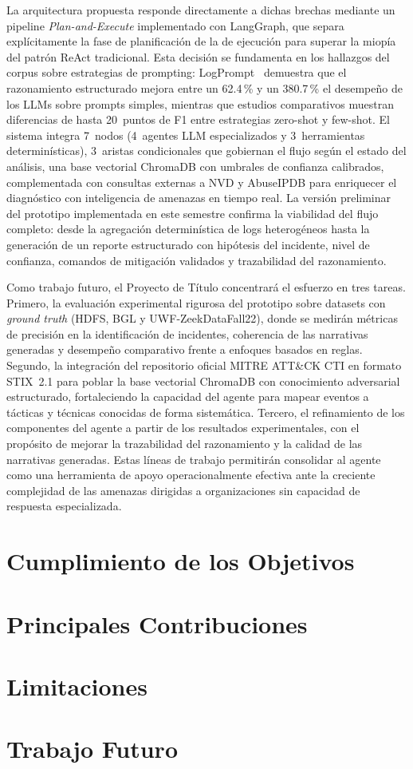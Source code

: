 La arquitectura propuesta responde directamente a dichas brechas mediante un pipeline \textit{Plan-and-Execute} implementado con LangGraph, que separa explícitamente la fase de planificación de la de ejecución para superar la miopía del patrón ReAct tradicional. Esta decisión se fundamenta en los hallazgos del corpus sobre estrategias de prompting: LogPrompt~\cite{liu2024logprompt} demuestra que el razonamiento estructurado mejora entre un 62.4\,\% y un 380.7\,\% el desempeño de los LLMs sobre prompts simples, mientras que estudios comparativos muestran diferencias de hasta 20~puntos de F1 entre estrategias zero-shot y few-shot. El sistema integra 7~nodos (4~agentes LLM especializados y 3~herramientas determinísticas), 3~aristas condicionales que gobiernan el flujo según el estado del análisis, una base vectorial ChromaDB con umbrales de confianza calibrados, complementada con consultas externas a NVD y AbuseIPDB para enriquecer el diagnóstico con inteligencia de amenazas en tiempo real. La versión preliminar del prototipo implementada en este semestre confirma la viabilidad del flujo completo: desde la agregación determinística de logs heterogéneos hasta la generación de un reporte estructurado con hipótesis del incidente, nivel de confianza, comandos de mitigación validados y trazabilidad del razonamiento.

Como trabajo futuro, el Proyecto de Título concentrará el esfuerzo en tres tareas. Primero, la evaluación experimental rigurosa del prototipo sobre datasets con \textit{ground truth} (HDFS, BGL y UWF-ZeekDataFall22), donde se medirán métricas de precisión en la identificación de incidentes, coherencia de las narrativas generadas y desempeño comparativo frente a enfoques basados en reglas. Segundo, la integración del repositorio oficial MITRE ATT\&CK CTI en formato STIX~2.1 para poblar la base vectorial ChromaDB con conocimiento adversarial estructurado, fortaleciendo la capacidad del agente para mapear eventos a tácticas y técnicas conocidas de forma sistemática. Tercero, el refinamiento de los componentes del agente a partir de los resultados experimentales, con el propósito de mejorar la trazabilidad del razonamiento y la calidad de las narrativas generadas. Estas líneas de trabajo permitirán consolidar al agente como una herramienta de apoyo operacionalmente efectiva ante la creciente complejidad de las amenazas dirigidas a organizaciones sin capacidad de respuesta especializada.

\section{Cumplimiento de los Objetivos}

\section{Principales Contribuciones}

\section{Limitaciones}

\section{Trabajo Futuro}